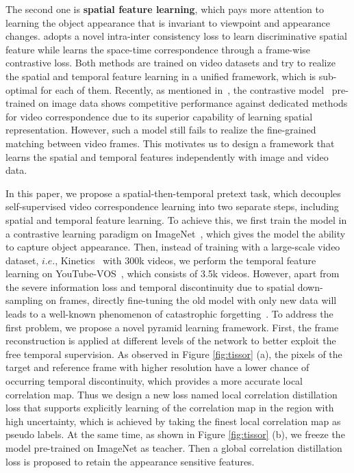 \documentclass{article}
\begin{document}
The second one is \textbf{spatial feature learning}, which pays more attention to learning the object appearance that is invariant to viewpoint and appearance changes. \cite{wang2020contrastive} adopts a novel intra-inter consistency loss to learn  discriminative spatial feature while \cite{xu2021rethinking} learns the space-time correspondence through a frame-wise contrastive loss. Both methods are trained on video datasets and try to realize the spatial and temporal feature learning in a unified framework, which is sub-optimal for each of them. Recently, as mentioned in~\cite{wang2021different}, the contrastive model~\cite{he2020momentum}\cite{xie2021detco} pre-trained on image data shows competitive performance against dedicated methods for video correspondence due to its superior capability of learning spatial representation. However,  such a model still fails to realize the fine-grained matching between video frames. This motivates us to design a framework that learns the spatial and temporal features independently with image and video data.  

In this paper, we propose a spatial-then-temporal pretext task, which decouples self-supervised video correspondence learning into two separate steps, including spatial and temporal feature learning. To achieve this, we first train the model in a contrastive learning paradigm on ImageNet~\cite{deng2009large}, which gives the model the ability to capture object appearance. Then, instead of training with a large-scale video dataset, $i.e.$, Kinetics~\cite{carreira2017quo} with 300k videos, we perform the temporal feature learning on YouTube-VOS~\cite{xu2018youtube}, which consists of 3.5k videos.  However, apart from the severe information loss and temporal discontinuity due to spatial down-sampling on frames, directly fine-tuning the old model with only new data will leads to a well-known phenomenon of catastrophic forgetting~\cite{li2017learning}. To address the first problem, we propose a novel pyramid learning framework. First, the frame reconstruction is applied at different levels of the network to better exploit the free temporal supervision. As observed in Figure \ref{fig:tissor} (a), the pixels of the target and reference frame with higher resolution have a lower chance of occurring temporal discontinuity, which provides a more accurate local correlation map. Thus we design a new loss named local correlation distillation loss that supports explicitly learning of the correlation map in the region with high uncertainty, which is achieved by taking the finest local correlation map as pseudo labels. At the same time, as shown in Figure \ref{fig:tissor} (b), we freeze the model pre-trained on ImageNet as teacher. Then a global correlation distillation loss is proposed to retain the appearance sensitive features. 
\end{document}
